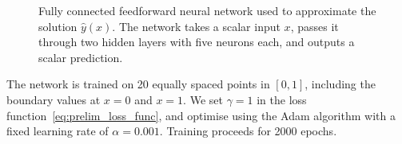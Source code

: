 \begin{figure}[ht]
    \centering
    \caption{Fully connected feedforward neural network used to approximate the solution \( \hat{y}(x) \). The network takes a scalar input \( x \), passes it through two hidden layers with five neurons each, and outputs a scalar prediction.}
    \label{fig:preamble_neural_net}
\end{figure}

The network is trained on 20 equally spaced points in \([0, 1]\), including the boundary values 
at \( x = 0 \) and \( x = 1 \). We set \( \gamma = 1 \) in the loss function~\eqref{eq:prelim_loss_func}, 
and optimise using the Adam algorithm with a fixed learning rate of \( \alpha = 0.001 \). Training 
proceeds for 2000 epochs.


